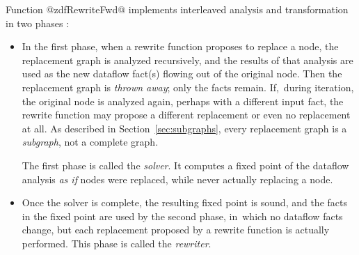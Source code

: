 \documentclass[blockstyle,preprint,natbib,nocopyrightspace]{sigplanconf}
\def\authornote#1{\unskip\relax}
\newcommand{\simon}[1]{\authornote{SLPJ: #1}}
\newcommand{\norman}[1]{\authornote{NR: #1}}
\let\remark\norman
\newcommand\secref[1]{Section~\ref{sec:#1}}
\newcommand\seclabel[1]{\label{sec:#1}}
\begin{document}
Function
@zdfRewriteFwd@ implements
interleaved analysis and transformation 
\remark{First mention of
interleaving is in \secref{interleave-introduced} on
page~\pageref{interleave-introduced}.}
in two phases \citep{lerner-grove-chambers:2002}:\seclabel{solver-phase}
\begin{itemize}
\item
In the first phase, when a rewrite function proposes to replace a
node, the replacement graph is analyzed recursively, and the results
of that analysis are used as the new dataflow
fact(s) flowing out of the original node.
Then the replacement
graph is \emph{thrown away}; only the facts remain.
If,~during iteration, the original node is analyzed again, perhaps
with a different input fact, the rewrite function may propose
a different replacement or even no replacement at all.
As described in \secref{subgraphs}, every replacement graph is a
\emph{subgraph}, not a complete graph.

The first phase is called the \emph{solver}.
It computes a fixed point of the dataflow analysis
\emph{as if} nodes were replaced, while never actually replacing a node.
\item
Once the solver is complete, the resulting fixed point is sound,
and the facts in the fixed point are used by the second phase, in~which
no dataflow facts change, but
each replacement proposed by a rewrite function is actually
performed.
This phase is called the \emph{rewriter}.
\end{itemize}
\end{document}
